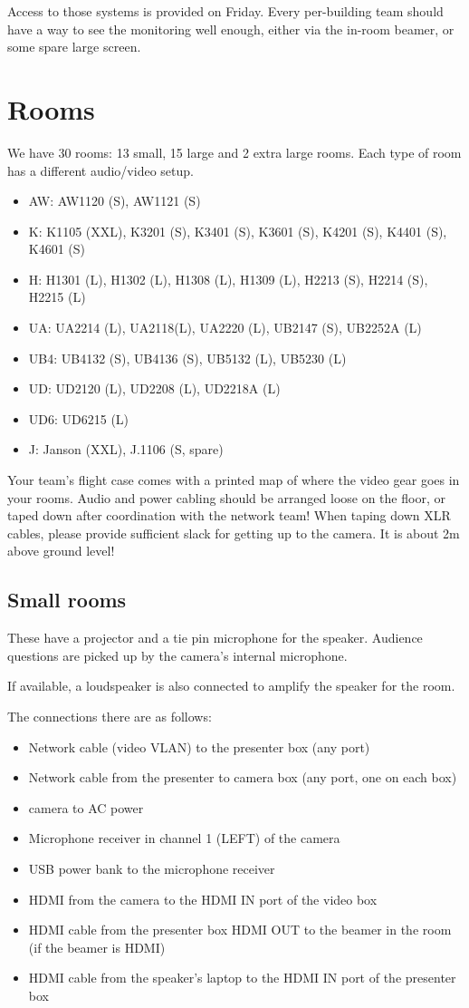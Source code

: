 \documentclass{article}
\begin{document}
Access to those systems is provided on Friday. Every per-building team should have a way to see the monitoring well enough, either via the in-room beamer, or some spare large screen.



\section{Rooms}
We have 30 rooms: 13 small, 15 large and 2 extra large rooms. Each type of room has a different audio/video setup.
\begin{itemize}
  \item AW: AW1120 (S), AW1121 (S)
  \item K: K1105 (XXL), K3201 (S), K3401 (S), K3601 (S), K4201 (S), K4401 (S), K4601 (S)
  \item H: H1301 (L), H1302 (L), H1308 (L), H1309 (L), H2213 (S), H2214 (S), H2215 (L)
  \item UA: UA2214 (L), UA2118(L), UA2220 (L), UB2147 (S), UB2252A (L)
  \item UB4: UB4132 (S), UB4136 (S), UB5132 (L), UB5230 (L)
  \item UD: UD2120 (L), UD2208 (L), UD2218A (L)
  \item UD6: UD6215 (L)
  \item J: Janson (XXL), J.1106 (S, spare)
\end{itemize}

Your team's flight case comes with a printed map of where the video gear goes in your rooms. Audio and power cabling should be arranged loose on the floor, or taped down after coordination with the network team! When taping down XLR cables, please provide sufficient slack for getting up to the camera. It is about 2m above ground level!

\subsection{Small rooms}
These have a projector and a tie pin microphone for the speaker. Audience questions are picked up by the camera's internal microphone.

If available, a loudspeaker is also connected to amplify the speaker for the room.

The connections there are as follows:

\begin{itemize}
  \item Network cable (video VLAN) to the presenter box (any port)
  \item Network cable from the presenter to camera box (any port, one on each box)
  \item camera to AC power
  \item Microphone receiver in channel 1 (LEFT) of the camera
  \item USB power bank to the microphone receiver
  \item HDMI from the camera to the HDMI IN port of the video box
  \item HDMI cable from the presenter box HDMI OUT to the beamer in the room (if the beamer is HDMI)
  \item HDMI cable from the speaker's laptop to the HDMI IN port of the presenter box
\end{itemize}
\end{document}
